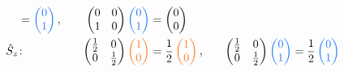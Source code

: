 \documentclass[
    10pt,
    ]{sotsu-beamer}
\begin{document}
\begin{frame}
\begin{alignat*}{3}
        &= 
        \mathcolor{blue}{ \begin{pmatrix} 0 \\ 1 \end{pmatrix} }
        , \quad
        &
        \begin{pmatrix}
            0 & 0 \\
            1 & 0
        \end{pmatrix}
        \mathcolor{blue}{ \begin{pmatrix} 0 \\ 1 \end{pmatrix} }
        &= 
        \mathcolor{black}{ \begin{pmatrix} 0 \\ 0 \end{pmatrix} }
        \\
        \hat{S}_z &\colon 
        &
        \begin{pmatrix}
            \frac{1}{2} & 0 \\
            0 & \frac{1}{2}
        \end{pmatrix}
        \mathcolor{red}{ \begin{pmatrix} 1 \\ 0 \end{pmatrix} }
        &= 
        \frac{1}{2}
        \mathcolor{red}{ \begin{pmatrix} 1 \\ 0 \end{pmatrix} }
        , \quad
        &
        \begin{pmatrix}
            \frac{1}{2} & 0 \\
            0 & \frac{1}{2}
        \end{pmatrix}
        \mathcolor{blue}{ \begin{pmatrix} 0 \\ 1 \end{pmatrix} }
        &= 
        \frac{1}{2}
        \mathcolor{blue}{ \begin{pmatrix} 0 \\ 1 \end{pmatrix} }
    \end{alignat*}
    

\end{frame}
\end{document}
